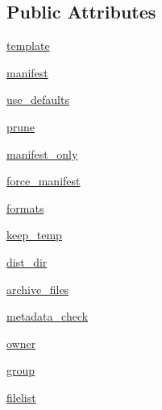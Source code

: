 \subsection*{Public Attributes}
\begin{DoxyCompactItemize}
\item 
\hyperlink{classsetuptools_1_1__distutils_1_1command_1_1sdist_1_1sdist_af90596dca2262bdaedcaf6f6a29455d2}{template}
\item 
\hyperlink{classsetuptools_1_1__distutils_1_1command_1_1sdist_1_1sdist_afd10af018825711d2a7c78bbd12f9542}{manifest}
\item 
\hyperlink{classsetuptools_1_1__distutils_1_1command_1_1sdist_1_1sdist_aa66068124d9753acc927c87c4acd4007}{use\+\_\+defaults}
\item 
\hyperlink{classsetuptools_1_1__distutils_1_1command_1_1sdist_1_1sdist_a391e316ef5fb2049f6cc92c2ecde3e86}{prune}
\item 
\hyperlink{classsetuptools_1_1__distutils_1_1command_1_1sdist_1_1sdist_a6280c8c361d302786ea1ded672889c8d}{manifest\+\_\+only}
\item 
\hyperlink{classsetuptools_1_1__distutils_1_1command_1_1sdist_1_1sdist_a9ef3f0b3aed280ec3722fa0301c3be58}{force\+\_\+manifest}
\item 
\hyperlink{classsetuptools_1_1__distutils_1_1command_1_1sdist_1_1sdist_a69fe4a099e6cea3b77f3cc5257aea85a}{formats}
\item 
\hyperlink{classsetuptools_1_1__distutils_1_1command_1_1sdist_1_1sdist_a60a0c34f4360971778cc58fdeceee656}{keep\+\_\+temp}
\item 
\hyperlink{classsetuptools_1_1__distutils_1_1command_1_1sdist_1_1sdist_a61c53ae9ef0b322681881193f39bfa2f}{dist\+\_\+dir}
\item 
\hyperlink{classsetuptools_1_1__distutils_1_1command_1_1sdist_1_1sdist_a55bc03fc8ad9edd546e8309ad4e11b18}{archive\+\_\+files}
\item 
\hyperlink{classsetuptools_1_1__distutils_1_1command_1_1sdist_1_1sdist_af020973fb937698e0f4d2c3e2fd2a224}{metadata\+\_\+check}
\item 
\hyperlink{classsetuptools_1_1__distutils_1_1command_1_1sdist_1_1sdist_a08afba6f0c2cd422dd3672e70ca42fd1}{owner}
\item 
\hyperlink{classsetuptools_1_1__distutils_1_1command_1_1sdist_1_1sdist_a03464ee1a071769743bac55d160c6ad5}{group}
\item 
\hyperlink{classsetuptools_1_1__distutils_1_1command_1_1sdist_1_1sdist_a2d32dd36906cdf35c3bcdbb8cbc672d4}{filelist}
\end{DoxyCompactItemize}

